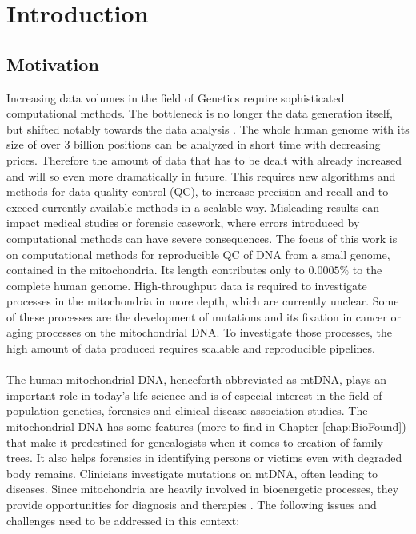 \chapter{Introduction}
\label{chapterIntro}
\section{Motivation}
Increasing data volumes in the field of Genetics require sophisticated computational methods. The bottleneck is no longer the data generation itself, but shifted notably towards the data analysis \cite{Forer2014}. The whole human genome with its size of over 3 billion positions can be analyzed in short time with decreasing prices. Therefore the amount of data that has to be dealt with already increased and will so even more dramatically in future. This requires new algorithms and methods for data quality control (QC), to  increase precision and recall and to exceed currently available methods in a scalable way. Misleading results can impact medical studies or forensic casework, where errors introduced by computational methods can have severe consequences. The focus of this work is on computational methods for reproducible QC of DNA from a small genome, contained in the mitochondria. Its length contributes only to $0.0005\%$ to the complete human genome. High-throughput data is required to investigate processes in the mitochondria in more depth, which are currently unclear. Some of these processes are the development of mutations and its fixation in cancer or aging processes on the mitochondrial DNA. To investigate those processes, the high amount of data produced requires scalable and reproducible pipelines. 
\\
\\
The human mitochondrial DNA, henceforth abbreviated as mtDNA, plays an important role in today's life-science and is of especial interest in the field of population genetics, forensics and clinical disease association studies. The mitochondrial DNA has some features (more to find in Chapter \ref{chap:BioFound}) that make it predestined for genealogists when it comes to creation of family trees. It also helps forensics in identifying persons or victims even with degraded body remains. Clinicians investigate mutations on mtDNA, often leading to diseases. Since mitochondria are heavily involved in bioenergetic processes, they provide opportunities for diagnosis and therapies \cite{Picard2016}.
The following issues and challenges need to be addressed in this context:
